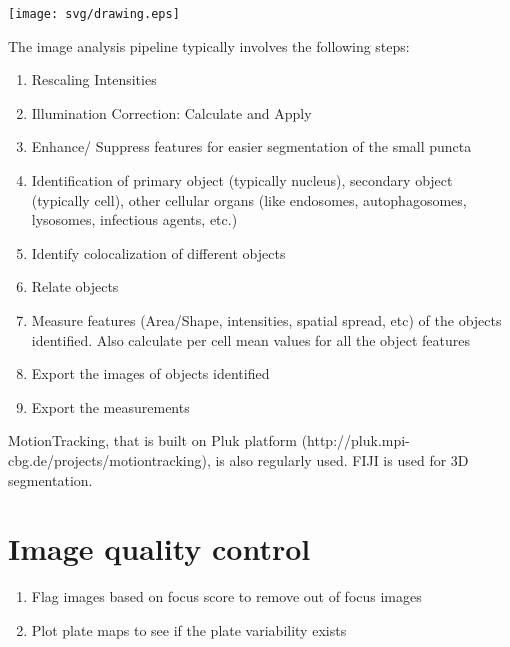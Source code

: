 \documentclass[12pt]{article}
\begin{document}
\begin{center} \texttt{[image: svg/drawing.eps]} \end{center}

The image analysis pipeline typically involves the following steps:
\begin{enumerate}
	\item Rescaling Intensities
	\item Illumination Correction: Calculate and Apply
	\item Enhance/ Suppress features for easier segmentation of the small puncta
	\item Identification of primary object (typically nucleus), secondary object (typically cell), other cellular organs (like endosomes, autophagosomes, lysosomes, infectious agents, etc.)
	\item Identify colocalization of different objects
	\item Relate objects
	\item Measure features (Area/Shape, intensities, spatial spread, etc) of the objects identified. Also calculate per cell mean values for all the object features
	\item Export the images of objects identified
	\item Export the measurements
\end{enumerate}
MotionTracking, that is built on Pluk platform (http://pluk.mpi-cbg.de/projects/motiontracking), is also regularly used. FIJI is used for 3D segmentation.


\section{Image quality control}
	\begin{enumerate}
	\item Flag images based on focus score to remove out of focus images
	\item Plot plate maps to see if the plate variability exists
	\end{enumerate}
	
\end{document}
